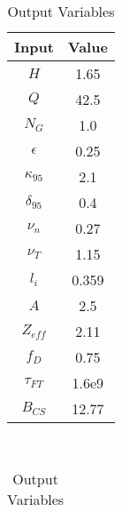 \begin{table}[h!]
\centering  
\caption{Act I Variables}
\hfill
\begin{subtable}[t]{0.4\textwidth}
\centering  
\caption{Input Variables} ~\\
\begin{tabular}{ c|c } 

Input            & Value           \\
\hline
$H$              & 1.65            \\
$Q$              & 42.5            \\
$N_{G}$          & 1.0             \\
$\epsilon$       & 0.25            \\
$\kappa_{95}$    & 2.1             \\
$\delta_{95}$    & 0.4             \\
$\nu_{n}$        & 0.27            \\
$\nu_{T}$        & 1.15            \\
$l_{i}$          & 0.359         \\
$A$              & 2.5             \\
$Z_{eff}$        & 2.11            \\
$f_{D}$          & 0.75            \\
$\tau_{FT}$      & 1.6e9           \\
$B_{CS}$         & 12.77           \\

\end{tabular}
\end{subtable}
\hfill
\begin{subtable}[t]{0.5\textwidth}
\centering  
\caption{Output Variables} ~\\
\begin{tabular}{ c|c|c } 


\end{tabular}
\end{subtable}
\end{table}
